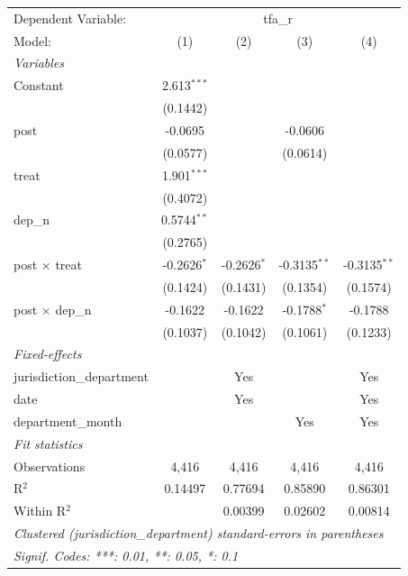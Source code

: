 \begingroup
\centering
\begin{tabular}{lcccc}
   \tabularnewline \midrule \midrule
   Dependent Variable: & \multicolumn{4}{c}{tfa\_r}\\
   Model:                    & (1)           & (2)           & (3)            & (4)\\  
   \midrule
   \emph{Variables}\\
   Constant                  & 2.613$^{***}$ &               &                &   \\   
                             & (0.1442)      &               &                &   \\   
   post                      & -0.0695       &               & -0.0606        &   \\   
                             & (0.0577)      &               & (0.0614)       &   \\   
   treat                     & 1.901$^{***}$ &               &                &   \\   
                             & (0.4072)      &               &                &   \\   
   dep\_n                    & 0.5744$^{**}$ &               &                &   \\   
                             & (0.2765)      &               &                &   \\   
   post $\times$ treat       & -0.2626$^{*}$ & -0.2626$^{*}$ & -0.3135$^{**}$ & -0.3135$^{**}$\\   
                             & (0.1424)      & (0.1431)      & (0.1354)       & (0.1574)\\   
   post $\times$ dep\_n      & -0.1622       & -0.1622       & -0.1788$^{*}$  & -0.1788\\   
                             & (0.1037)      & (0.1042)      & (0.1061)       & (0.1233)\\   
   \midrule
   \emph{Fixed-effects}\\
   jurisdiction\_department  &               & Yes           &                & Yes\\  
   date                      &               & Yes           &                & Yes\\  
   department\_month         &               &               & Yes            & Yes\\  
   \midrule
   \emph{Fit statistics}\\
   Observations              & 4,416         & 4,416         & 4,416          & 4,416\\  
   R$^2$                     & 0.14497       & 0.77694       & 0.85890        & 0.86301\\  
   Within R$^2$              &               & 0.00399       & 0.02602        & 0.00814\\  
   \midrule \midrule
   \multicolumn{5}{l}{\emph{Clustered (jurisdiction\_department) standard-errors in parentheses}}\\
   \multicolumn{5}{l}{\emph{Signif. Codes: ***: 0.01, **: 0.05, *: 0.1}}\\
\end{tabular}
\par\endgroup
